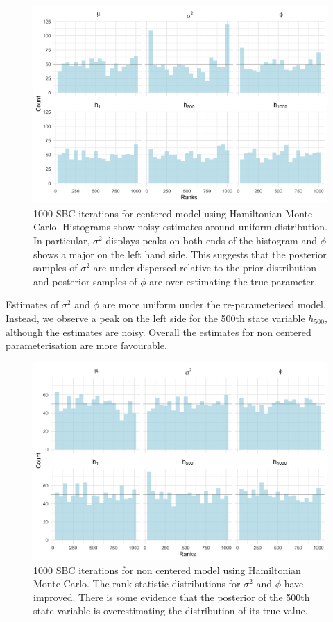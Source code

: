 \documentclass[12pt, a4paper]{article}
\begin{document}
    \begin{figure}[H]
        \centering
        \includegraphics[scale=0.09]{results/hmc_cp_1k.png}
        \caption{1000 SBC iterations for centered model using Hamiltonian Monte Carlo. Histograms show noisy estimates around uniform distribution. In particular, $\sigma^2$ displays peaks on both ends of the histogram and $\phi$ shows a major on the left hand side. This suggests that the posterior samples of $\sigma^2$ are under-dispersed relative to the prior distribution and posterior samples of $\phi$ are over estimating the true parameter.}
        \label{fig:cphmc1k}
    \end{figure} 

    Estimates of $\sigma^2$ and $\phi$ are more uniform under the re-parameterised model. Instead, we observe a peak on the left side for the 500th state variable $h_{500}$, although the estimates are noisy. Overall the estimates for non centered parameterisation are more favourable. 

    \begin{figure}[H]
        \centering
        \includegraphics[scale=0.09]{results/hmc_ncp_1k.png}
        \caption{1000 SBC iterations for non centered model using Hamiltonian Monte Carlo. The rank statistic distributions for $\sigma^2$ and $\phi$ have improved. There is some evidence that the posterior of the 500th state variable is overestimating the distribution of its true value.}
        \label{fig:ncphmc1k}
    \end{figure}
\end{document}
